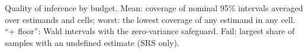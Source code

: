 \begin{table}[t]\centering\small
\caption{Quality of inference by budget. Mean: coverage of nominal 95\% intervals averaged over estimands and cells; worst: the lowest coverage of any estimand in any cell. ``+ floor'': Wald intervals with the zero-variance safeguard. Fail: largest share of samples with an undefined estimate (SRS only).}\label{tab:inference}

\end{table}
